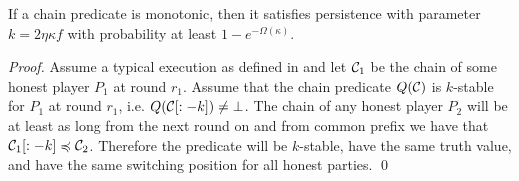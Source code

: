 \begin{theorem}
    If a chain predicate is monotonic, then it satisfies persistence with
    parameter $k = 2\eta \kappa f$ with probability at least $1 -
    e^{-\Omega(\kappa)}$.
\end{theorem}

\begin{proof}
    Assume a typical execution as defined in \cite{backbone} and let $\mathcal{C}_1$
    be the chain of some honest player $P_1$ at round $r_1$. Assume that the
    chain predicate $Q(\mathcal{C})$ is $k$-stable for $P_1$ at round $r_1$, i.e.
    $Q(\mathcal{C}[:-k]) \neq \bot$.  The chain of any honest player $P_2$ will be
    at least as long from the next round on and from common prefix we have that
    $\mathcal{C}_1[:-k] \preccurlyeq \mathcal{C}_2$. Therefore the predicate will be
    $k$-stable, have the same truth value, and have the same switching position
    for all honest parties.
    \qed
\end{proof}

